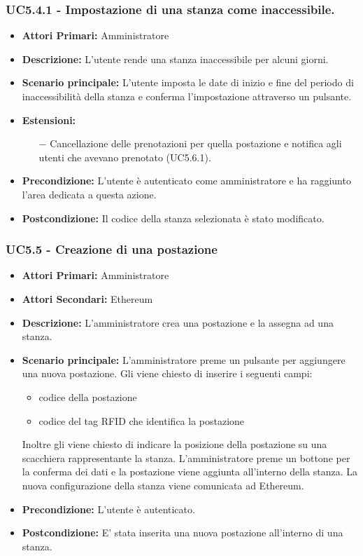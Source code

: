 \subsubsection{ UC5.4.1 - Impostazione di una stanza come inaccessibile.}
\begin{itemize}
	\item\textbf{Attori Primari:}
	Amministratore 
	\item\textbf{Descrizione:}
	L'utente rende una stanza inaccessibile per alcuni giorni.
	\item\textbf{Scenario principale:} 
	L'utente imposta le date di inizio e fine del periodo di inaccessibilità della stanza e conferma l'impostazione attraverso un pulsante.
	\item\textbf{Estensioni:}
	\begin{itemize}
		\item[$-$] Cancellazione delle prenotazioni per quella postazione e notifica agli utenti che avevano prenotato (UC5.6.1).
	\end{itemize}
	\item\textbf{Precondizione:} 
	L'utente è autenticato come amministratore e ha raggiunto l'area dedicata a questa azione.
	\item\textbf{Postcondizione:}
	Il codice della stanza selezionata è stato modificato.
\end{itemize}

\subsubsection{ UC5.5 - Creazione di una postazione}
\begin{itemize}
	\item\textbf{Attori Primari:}
	Amministratore 
	\item\textbf{Attori Secondari:}
	Ethereum
	\item\textbf{Descrizione:}
	L'amministratore crea una postazione e la assegna ad una stanza.
	\item\textbf{Scenario principale:} 
	L'amministratore preme un pulsante per aggiungere una nuova postazione. Gli viene chiesto di inserire i seguenti campi:
	\begin{itemize}
		\item{codice della postazione}
		\item{codice del tag RFID che identifica la postazione}
	\end{itemize}
	Inoltre gli viene chiesto di indicare la posizione della postazione su una scacchiera rappresentante la stanza.
	L'amministratore preme un bottone per la conferma dei dati e la postazione viene aggiunta all'interno della stanza. La nuova configurazione della stanza viene comunicata ad Ethereum.
	\item\textbf{Precondizione:} 
	L'utente è autenticato.
	\item\textbf{Postcondizione:}
	E' stata inserita una nuova postazione all'interno di una stanza.
\end{itemize}

